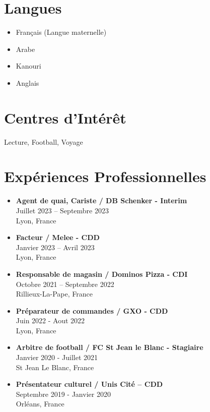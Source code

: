 \documentclass{article}
\begin{document}
\section*{Langues}
\begin{itemize}[label=--]
    \item Français (Langue maternelle)
    \item Arabe
    \item Kanouri
    \item Anglais
\end{itemize}

\section*{Centres d'Intérêt}
Lecture, Football, Voyage

\section*{Expériences Professionnelles}
\begin{itemize}[label=--]
    \item \textbf{Agent de quai, Cariste / DB Schenker - Interim}\\
    Juillet 2023 – Septembre 2023 \\
    Lyon, France
    
    \item \textbf{Facteur / Melee - CDD}\\
    Janvier 2023 – Avril 2023 \\
    Lyon, France
    
    \item \textbf{Responsable de magasin / Dominos Pizza - CDI}\\
    Octobre 2021 – Septembre 2022 \\
    Rillieux-La-Pape, France
    
    \item \textbf{Préparateur de commandes / GXO - CDD}\\
    Juin 2022 - Aout 2022 \\
    Lyon, France
    
    \item \textbf{Arbitre de football / FC St Jean le Blanc - Stagiaire}\\
    Janvier 2020 - Juillet 2021 \\
    St Jean Le Blanc, France
    
    \item \textbf{Présentateur culturel / Unis Cité – CDD}\\
    Septembre 2019 - Janvier 2020 \\
    Orléans, France
\end{itemize}
\end{document}
